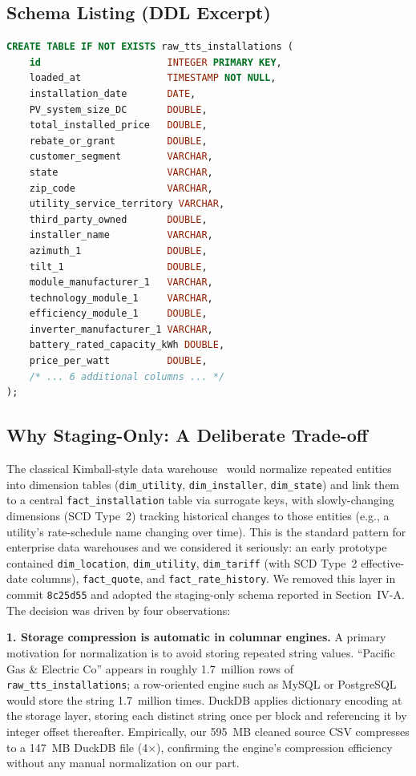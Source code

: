 \documentclass[10pt, conference]{IEEEtran}
\begin{document}
\subsection{Schema Listing (DDL Excerpt)}

\begin{lstlisting}[language=SQL, caption={DDL for raw\_tts\_installations (the analytical core)}, label={lst:tts_ddl}]
CREATE TABLE IF NOT EXISTS raw_tts_installations (
    id                      INTEGER PRIMARY KEY,
    loaded_at               TIMESTAMP NOT NULL,
    installation_date       DATE,
    PV_system_size_DC       DOUBLE,
    total_installed_price   DOUBLE,
    rebate_or_grant         DOUBLE,
    customer_segment        VARCHAR,
    state                   VARCHAR,
    zip_code                VARCHAR,
    utility_service_territory VARCHAR,
    third_party_owned       DOUBLE,
    installer_name          VARCHAR,
    azimuth_1               DOUBLE,
    tilt_1                  DOUBLE,
    module_manufacturer_1   VARCHAR,
    technology_module_1     VARCHAR,
    efficiency_module_1     DOUBLE,
    inverter_manufacturer_1 VARCHAR,
    battery_rated_capacity_kWh DOUBLE,
    price_per_watt          DOUBLE,
    /* ... 6 additional columns ... */
);
\end{lstlisting}

\subsection{Why Staging-Only: A Deliberate Trade-off}

The classical Kimball-style data warehouse~\cite{Kimball2013} would
normalize repeated entities into dimension tables (\texttt{dim\_utility},
\texttt{dim\_installer}, \texttt{dim\_state}) and link them to a central
\texttt{fact\_installation} table via surrogate keys, with slowly-changing
dimensions (SCD Type~2) tracking historical changes to those entities
(e.g., a utility's rate-schedule name changing over time). This is the
standard pattern for enterprise data warehouses and we considered it
seriously: an early prototype contained \texttt{dim\_location},
\texttt{dim\_utility}, \texttt{dim\_tariff} (with SCD Type~2 effective-date
columns), \texttt{fact\_quote}, and \texttt{fact\_rate\_history}. We
removed this layer in commit \texttt{8c25d55} and adopted the staging-only
schema reported in Section~IV-A. The decision was driven by four observations:

\textbf{1. Storage compression is automatic in columnar engines.}
A primary motivation for normalization is to avoid storing repeated string
values. ``Pacific Gas \& Electric Co'' appears in roughly 1.7~million rows
of \texttt{raw\_tts\_installations}; a row-oriented engine such as MySQL
or PostgreSQL would store the string 1.7~million times. DuckDB applies
dictionary encoding at the storage layer, storing each distinct string
once per block and referencing it by integer offset thereafter. Empirically,
our 595~MB cleaned source CSV compresses to a 147~MB DuckDB file (4$\times$),
confirming the engine's compression efficiency without any manual
normalization on our part.
\end{document}
